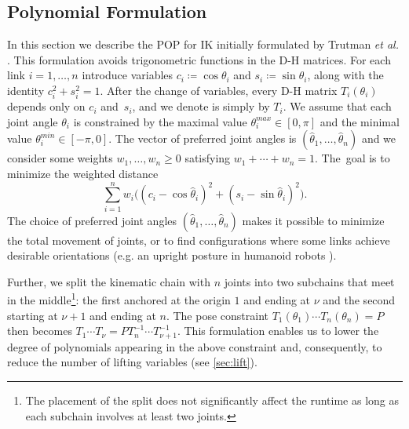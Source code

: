 \subsection{Polynomial Formulation}
In this section we describe the POP for IK initially formulated by Trutman \textit{et al.} \cite{trutman2022globally}. This formulation avoids trigonometric functions in the D-H matrices. For each link $i=1,\dots,n$ introduce variables $c_i \coloneqq \cos \theta_i $ and $s_i\coloneqq \sin \theta_i$, along with the identity $c_i^2 + s_i^2 = 1$. After the change of variables, every D-H matrix $T_i(\theta_i)$ depends only on $c_i$ and~$s_i$, and we denote is simply by $T_i$.  We assume that each joint angle $\theta_i$ is constrained by the maximal value $\theta^{\mathit{max}}_i\in [0,\pi]$ and the minimal value $\theta^{\mathit{min}}_i\in [-\pi,0]$. The vector of preferred joint angles is $(\hat{\theta}_1,\dots,\hat{\theta}_n)$ and we consider some weights $w_1,\dots,w_n\ge 0$ satisfying $w_1+\dotsb + w_n=1$. The~goal is to minimize the weighted distance
\begin{equation}\label{criterion}
\sum_{i=1}^n w_i\bigl((c_i-\cos \hat{\theta}_i)^2+(s_i-\sin \hat{\theta}_i)^2\bigr).
\end{equation}
The choice of preferred joint angles $(\hat{\theta}_1,\dots,\hat{\theta}_n)$ makes it possible to minimize the total movement of joints, or to find configurations where some links achieve desirable orientations (e.g. an upright posture in humanoid robots \cite{minimumjerk}).

Further, we split the kinematic chain with $n$ joints into two subchains that meet in the middle\footnote{The placement of the split does not significantly affect the runtime as long as each subchain involves at least two joints.}: the first anchored at the origin $1$ and ending at $\nu$ and the second starting at $\nu+1$ and ending at $n$. The pose constraint $T_1(\theta_1)\dotsb T_n(\theta_n)= P$ then becomes $T_1\dotsb T_\nu = P T_n^{-1}\dotsb T_{\nu+1}^{-1}$.
This formulation enables us to lower the degree of polynomials appearing in the above constraint and, consequently, to reduce the number of lifting variables (see \cref{sec:lift}).

